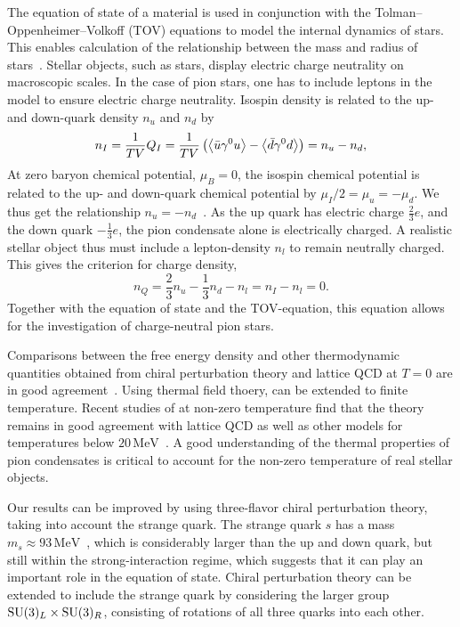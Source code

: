 The equation of state of a material is used in conjunction with the Tolman–Oppenheimer–Volkoff (TOV) equations to model the internal dynamics of stars.
This enables calculation of the relationship between the mass and radius of stars~\cite{Carroll:spacetime}.
Stellar objects, such as stars, display electric charge neutrality on macroscopic scales.
In the case of pion stars, one has to include leptons in the model to ensure electric charge neutrality.
Isospin density is related to the up- and down-quark density $n_u$ and $n_d$ by
\begin{equation}
    n_I 
    = \frac{1}{TV} Q_I 
    = \frac{1}{TV} \left(\ex{\bar u \gamma^0 u} - \ex{\bar d \gamma^0 d} \right) 
    = n_u - n_d,
\end{equation}
At zero baryon chemical potential, $\mu_B = 0$, the isospin chemical potential is related to the up- and down-quark chemical potential by $\mu_I/2 = \mu_u = -\mu_d$.
We thus get the relationship $n_u = -n_d$~\cite{new_clas_of_compact_stars}.
As the up quark has electric charge $\frac{2}{3}e$, and the down quark $-\frac{1}{3}e$, the pion condensate alone is electrically charged.
A realistic stellar object thus must include a lepton-density $n_l$ to remain neutrally charged.
This gives the criterion for charge density,
\begin{equation}
    n_Q = \frac{2}{3}n_u - \frac{1}{3} n_d - n_l = n_I - n_l = 0.
\end{equation}
Together with the equation of state and the TOV-equation, this equation allows for the investigation of charge-neutral pion stars.

Comparisons between the free energy density and other thermodynamic quantities obtained from chiral perturbation theory and lattice QCD at $T = 0$ are in good agreement~\cite{Andersen:two-flavor-chpt,mojahed}.
Using thermal field thoery, \chpt can be extended to finite temperature.
Recent 
studies of \chpt at non-zero temperature find that the theory remains in good agreement with lattice QCD as well as other models for temperatures below $20 \, \text{MeV}$~\cite{andersen_mojahed:condensates_and_pressure}.
A good understanding of the thermal properties of pion condensates is critical to account for the non-zero temperature of real stellar objects.

Our results can be improved by using three-flavor chiral perturbation theory, taking into account the strange quark.
The strange quark $s$ has a mass $m_s \approx 93 \, \text{MeV}$~\cite{PDG}, which is considerably larger than the up and down quark, but still within the strong-interaction regime, which suggests that it can play an important role in the equation of state.
Chiral perturbation theory can be extended to include the strange quark by considering the larger group $\mathrm{SU}(3)_L \times \mathrm{SU}(3)_R$, consisting of rotations of all three quarks into each other.
